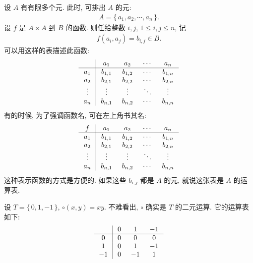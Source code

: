 \begin{remark}
    设 $A$ 有有限多个元. 此时, 可排出 $A$ 的元:
    \begin{align*}
        A = \{\, a_1, a_2, \cdots, a_n \,\}.
    \end{align*}
    设 $f$ 是 $A \times A$ 到 $B$ 的函数. 则任给整数 $i,j$, $1 \leq i,j \leq n$, 记
    \begin{align*}
        f(a_i, a_j) = b_{i,j} \in B.
    \end{align*}
    可以用这样的表描述此函数:
    \begin{align*}
        \arraycolsep=0.25cm
        \begin{array}{c|cccc}
            \      & a_1     & a_2     & \cdots & a_n     \\ \hline
            a_1    & b_{1,1} & b_{1,2} & \cdots & b_{1,n} \\
            a_2    & b_{2,1} & b_{2,2} & \cdots & b_{2,n} \\
            \vdots & \vdots  & \vdots  & \ddots & \vdots  \\
            a_n    & b_{n,1} & b_{n,2} & \cdots & b_{n,n} \\
        \end{array}
    \end{align*}
    有的时候, 为了强调函数名, 可在左上角书其名:
    \begin{align*}
        \arraycolsep=0.25cm
        \begin{array}{c|cccc}
            f      & a_1     & a_2     & \cdots & a_n     \\ \hline
            a_1    & b_{1,1} & b_{1,2} & \cdots & b_{1,n} \\
            a_2    & b_{2,1} & b_{2,2} & \cdots & b_{2,n} \\
            \vdots & \vdots  & \vdots  & \ddots & \vdots  \\
            a_n    & b_{n,1} & b_{n,2} & \cdots & b_{n,n} \\
        \end{array}
    \end{align*}
    这种表示函数的方式是方便的. 如果这些 $b_{i,j}$ 都是 $A$ 的元, 就说这张表是 $A$ 的运算表.
\end{remark}

\begin{example}
    设 $T = \{\, 0,1,-1 \,\}$, $\circ (x,y) = xy$. 不难看出, $\circ$ 确实是 $T$ 的二元运算. 它的运算表如下:
    \begin{align*}
        \arraycolsep=0.25cm
        \begin{array}{c|ccc}
            \  & 0 & 1  & -1 \\ \hline
            0  & 0 & 0  & 0  \\
            1  & 0 & 1  & -1 \\
            -1 & 0 & -1 & 1  \\
        \end{array}
    \end{align*}
\end{example}

